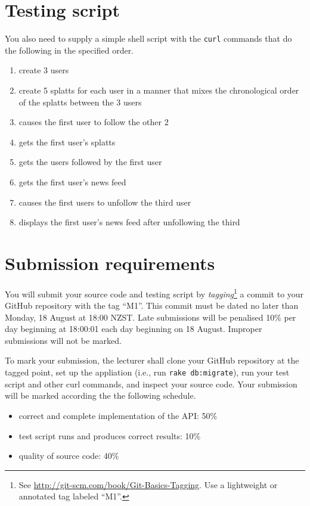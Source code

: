\documentclass{article}
\begin{document}
\section{Testing script}
  You also need to supply a simple shell script with the \texttt{curl} commands that do the following in the specified order.
  \begin{enumerate}
     \item create 3 users
     \item create 5 splatts for each user in a manner that mixes the chronological order of the splatts between the 3 users
     \item causes the first user to follow the other 2
     \item gets the first user's splatts
     \item gets the users followed by the first user 
     \item gets the first user's news feed
     \item causes the first users to unfollow the third user
     \item displays the first user's news feed after unfollowing the third
  \end{enumerate}

\section{Submission requirements}
  You will submit your source code and testing script by \emph{tagging}\footnote{See \url{http://git-scm.com/book/Git-Basics-Tagging}.  Use a lightweight or annotated tag labeled ``M1''.} a commit to your GitHub repository with the tag ``M1''.  This commit must be dated no later than Monday, 18 August at 18:00 NZST. Late submissions will be penalised 10\% per day beginning at 18:00:01 each day beginning on 18 August.  Improper submissions will not be marked.  

To mark your submission, the lecturer shall clone your GitHub repository at the tagged point, set up the appliation (i.e., run \texttt{rake db:migrate}), run your test script and other curl commands, and inspect your source code.  Your submission will be marked according the the following schedule.

\begin{itemize}
  \item correct and complete implementation of the API:  50\%
  \item test script runs and produces correct results: 10\%
  \item quality of source code: 40\%
\end{itemize}
\end{document}
